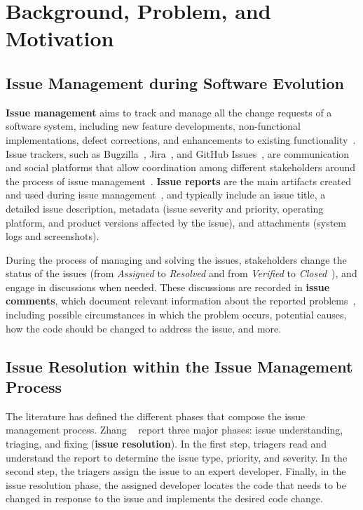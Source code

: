 
\section{Background, Problem, and Motivation}
\label{sec:background}


\subsection{Issue Management during Software Evolution}


\textbf{Issue management} aims to track and manage all the change requests of a software system, including new feature developments, non-functional implementations, defect corrections, and enhancements to existing functionality~\cite{Zimmermann2010,zeller2009programs,rajlich2011software}. 
Issue trackers, such as Bugzilla~\cite{bugzillaBugzilla}, Jira~\cite{jira}, and GitHub Issues~\cite{github}, are communication and social platforms that allow coordination among different stakeholders around the process of issue management~\cite{bertram2009social,bertram2010communication,xia2013accurate}.
\textbf{Issue reports} are the main artifacts created and used during issue management~\cite{Zimmermann2010}, and  
typically include an issue title, a detailed issue description, metadata  (\eg issue severity and priority, operating platform, and product versions affected by the issue), and attachments (\eg system logs and screenshots). 

During the process of managing and solving the issues, stakeholders change the status of the issues (\eg from \textit{Assigned} to \textit{Resolved} and from \textit{Verified} to \textit{Closed}~\cite{eren2023analyzing,bugzila-bug-lifecycle}), and engage in discussions when needed. These discussions are recorded in \textbf{issue comments}, which document relevant information about the reported problems~\cite{zeller2009programs}, including possible circumstances in which the problem occurs, potential causes, how the code should be changed to address the issue, and more.




\subsection{Issue Resolution within the Issue Management Process}
\label{sub:background_issue_res}




The literature has defined the different phases that compose the issue management process.  Zhang \etal~\cite{zhang2016literature} report three major phases: issue understanding, triaging, and fixing (\aka \textbf{issue resolution}). In the first step, triagers read and understand the report to determine the issue type, priority, and severity. In the second step, the triagers assign the issue to an expert developer. Finally, in the issue resolution phase, the assigned developer locates the code that needs to be changed in response to the issue and implements the desired code change.

